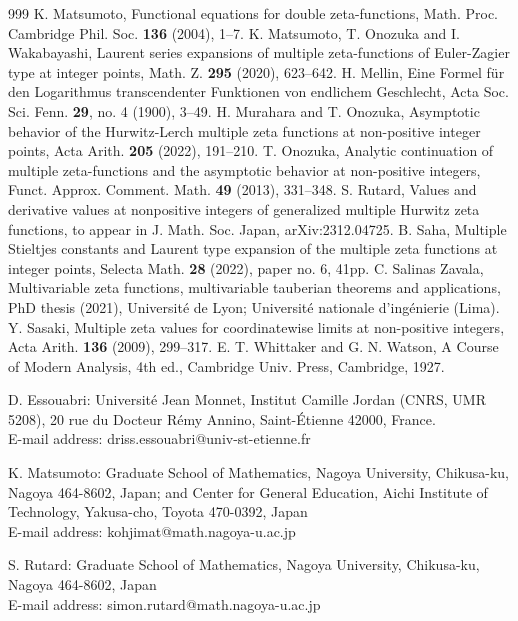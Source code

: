 \documentclass[a4paper,12pt]{article}
\theoremstyle{definition}
\numberwithin{equation}{section}
\begin{document}
\begin{thebibliography}{999}
K. Matsumoto,
Functional equations for double zeta-functions,
Math. Proc. Cambridge Phil. Soc. {\bf 136} (2004), 1--7.
K. Matsumoto, T. Onozuka and I. Wakabayashi,
Laurent series expansions of multiple zeta-functions of Euler-Zagier type at integer points,
Math. Z. {\bf 295} (2020), 623--642.
H. Mellin,
Eine Formel f{\"u}r den Logarithmus transcendenter Funktionen von endlichem Geschlecht,
Acta Soc. Sci. Fenn. {\bf 29}, no. 4 (1900), 3--49.
H. Murahara and T. Onozuka,
Asymptotic behavior of the Hurwitz-Lerch multiple zeta functions
at non-positive integer points,
Acta Arith. {\bf 205} (2022), 191--210.
T. Onozuka,
Analytic continuation of multiple zeta-functions and the asymptotic behavior at non-positive
integers, Funct. Approx. Comment. Math. {\bf 49} (2013), 331--348.
S. Rutard,
Values and derivative values at nonpositive integers of generalized multiple Hurwitz zeta functions, to appear in J. Math. Soc. Japan, arXiv:2312.04725.
B. Saha,
Multiple Stieltjes constants and Laurent type expansion of the multiple zeta functions at
integer points, Selecta Math. {\bf 28} (2022), paper no. 6, 41pp.
C. Salinas Zavala, Multivariable zeta functions, multivariable tauberian theorems and applications, PhD thesis (2021), Universit{\'e} de Lyon; Universit{\'e} nationale d’ing{\'e}nierie (Lima).
Y. Sasaki,
Multiple zeta values for coordinatewise limits at non-positive
integers,
Acta Arith. {\bf 136} (2009), 299--317.
E. T. Whittaker and G. N. Watson,
A Course of Modern Analysis, 4th ed.,
Cambridge Univ. Press, Cambridge, 1927.
\end{thebibliography}
\par
D. Essouabri: Université Jean Monnet, Institut Camille Jordan (CNRS, UMR 5208), 20 rue du Docteur Rémy Annino, Saint-Étienne 42000, France.\\
E-mail address: driss.essouabri@univ-st-etienne.fr
\par
K. Matsumoto: Graduate School of Mathematics, Nagoya University,
Chikusa-ku, Nagoya 464-8602, Japan; and Center for General Education, 
Aichi Institute of Technology, Yakusa-cho, Toyota 470-0392, Japan\\
E-mail address: kohjimat@math.nagoya-u.ac.jp
\par
S. Rutard: Graduate School of Mathematics, Nagoya University,
Chikusa-ku, Nagoya 464-8602, Japan\\
E-mail address: simon.rutard@math.nagoya-u.ac.jp
\end{document}
